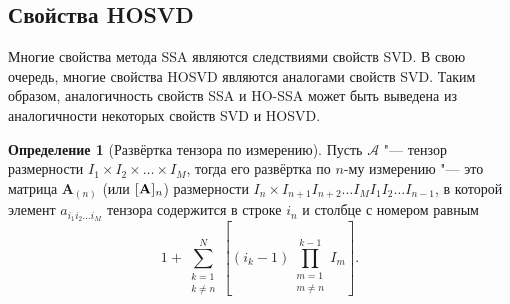 \documentclass[specialist,
    substylefile = spbu_report.rtx,
    subf,href,colorlinks=true, 12pt]{disser}
\theoremstyle{plain}
\theoremstyle{definition}
\newtheorem{definition}{Определение}[section]
\theoremstyle{remark}
\begin{document}
    \subsection{Свойства HOSVD}\label{subsec:hosvd-properties}
    Многие свойства метода SSA являются следствиями свойств SVD\@.
    В свою очередь, многие свойства HOSVD являются аналогами свойств SVD\@.
    Таким образом, аналогичность свойств SSA и HO-SSA может быть выведена из аналогичности некоторых свойств SVD и HOSVD\@.
    \begin{definition}[Развёртка тензора по измерению]
        Пусть $\mathcal{A}$ "--- тензор размерности $I_1\times I_2\times\ldots\times I_M$, тогда его развёртка
        по $n$-му измерению "--- это матрица $\mathbf{A}_{(n)}$ (или $[\mathbf{A}]_n$)
        размерности $I_n\times I_{n+1}I_{n+2}\ldots I_{M}I_{1}I_{2}\ldots I_{n-1}$,
        в которой элемент $a_{i_1 i_2\ldots i_M}$ тензора содержится в строке $i_n$ и столбце с номером равным
        \[
            1 + \sum_{\substack{k = 1 \\ k \ne n}}^{N} \left[(i_k - 1) 
            \prod_{\substack{m=1 \\ m\ne n}}^{k-1} I_m\right].
        \]


\end{definition}
\end{document}
